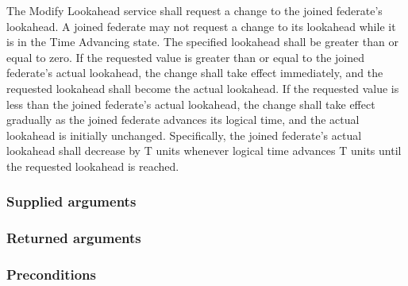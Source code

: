 \begin{compactstdpage}
    The Modify Lookahead service shall request a change to the joined federate's lookahead. A joined federate may not request a change to its lookahead while it is in the Time Advancing state. The specified lookahead shall be greater than or equal to zero. If the requested value is greater than or equal to the joined federate's actual lookahead, the change shall take effect immediately, and the requested lookahead shall become the actual lookahead. If the requested value is less than the joined federate's actual lookahead, the change shall take effect gradually as the joined federate advances its logical time, and the actual lookahead is initially unchanged. Specifically, the joined federate's actual lookahead shall decrease by T units whenever logical time advances T units until the requested lookahead is reached.

    \subsubsection{Supplied arguments}


    \subsubsection{Returned arguments}


    \subsubsection{Preconditions}



\end{compactstdpage}

\clearpage

